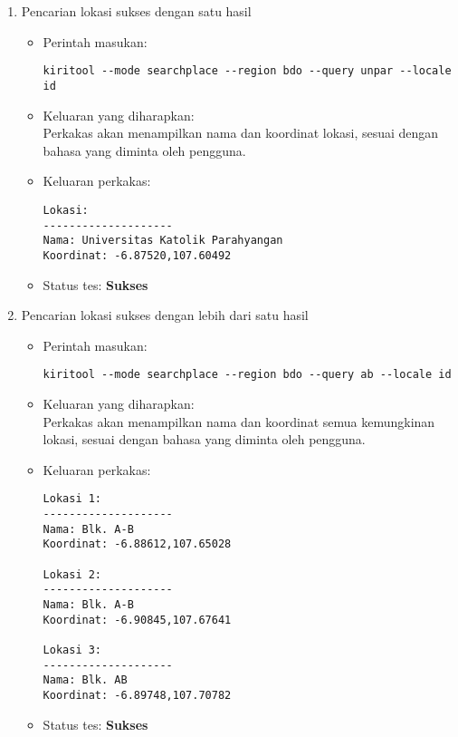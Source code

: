 \begin{enumerate}
	\item Pencarian lokasi sukses dengan satu hasil
	\begin{itemize}
		\item Perintah masukan:
		\begin{lstlisting}
kiritool --mode searchplace --region bdo --query unpar --locale id
		\end{lstlisting}
		\item Keluaran yang diharapkan: \\
		Perkakas akan menampilkan nama dan koordinat \latlon\xspace lokasi, sesuai dengan bahasa yang diminta oleh pengguna.
		\item Keluaran perkakas:
		\begin{lstlisting}
Lokasi:
--------------------
Nama: Universitas Katolik Parahyangan
Koordinat: -6.87520,107.60492
		\end{lstlisting}
		\item Status tes: \textbf{Sukses}
	\end{itemize}
	
	\item Pencarian lokasi sukses dengan lebih dari satu hasil
	\begin{itemize}
		\item Perintah masukan:
		\begin{lstlisting}
kiritool --mode searchplace --region bdo --query ab --locale id
		\end{lstlisting}
		\item Keluaran yang diharapkan: \\
		Perkakas akan menampilkan nama dan koordinat \latlon\xspace semua kemungkinan lokasi, sesuai dengan bahasa yang diminta oleh pengguna.
		\item Keluaran perkakas:
		\begin{lstlisting}
Lokasi 1:
--------------------
Nama: Blk. A-B
Koordinat: -6.88612,107.65028

Lokasi 2:
--------------------
Nama: Blk. A-B
Koordinat: -6.90845,107.67641

Lokasi 3:
--------------------
Nama: Blk. AB
Koordinat: -6.89748,107.70782
		\end{lstlisting}
		\item Status tes: \textbf{Sukses}
	\end{itemize}
	

\end{enumerate}
